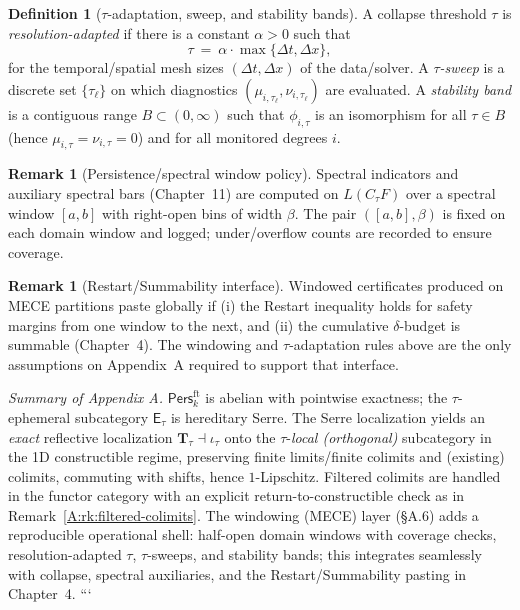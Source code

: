 \documentclass[11pt]{article}
\newcommand{\Pers}{\mathsf{Pers}}
\numberwithin{equation}{section}
\theoremstyle{definition}
\newtheorem{definition}[theorem]{Definition}
\newtheorem{remark}[theorem]{Remark}
\begin{document}
\begin{definition}[\(\tau\)-adaptation, sweep, and stability bands]\label{A:def:tau-adapt}
A collapse threshold \(\tau\) is \emph{resolution-adapted} if there is a constant \(\alpha>0\) such that
\[
\tau\ =\ \alpha\cdot \max\{\Delta t,\Delta x\},
\]
for the temporal/spatial mesh sizes \((\Delta t,\Delta x)\) of the data/solver. A \emph{\(\tau\)-sweep} is a discrete set \(\{\tau_\ell\}\) on which diagnostics \((\mu_{i,\tau_\ell},\nu_{i,\tau_\ell})\) are evaluated. A \emph{stability band} is a contiguous range \(B\subset (0,\infty)\) such that \(\phi_{i,\tau}\) is an isomorphism for all \(\tau\in B\) (hence \(\mu_{i,\tau}=\nu_{i,\tau}=0\)) and for all monitored degrees \(i\).
\end{definition}

\begin{remark}[Persistence/spectral window policy]
Spectral indicators and auxiliary spectral bars (Chapter~11) are computed on \(L(C_\tau F)\) over a spectral window \([a,b]\) with right-open bins of width \(\beta\). The pair \(([a,b],\beta)\) is fixed on each domain window and logged; under/overflow counts are recorded to ensure coverage.
\end{remark}

\begin{remark}[Restart/Summability interface]
Windowed certificates produced on MECE partitions paste globally if (i) the Restart inequality holds for safety margins from one window to the next, and (ii) the cumulative \(\delta\)-budget is summable (Chapter~4). The windowing and \(\tau\)-adaptation rules above are the only assumptions on Appendix~A required to support that interface.
\end{remark}

\medskip
\noindent\emph{Summary of Appendix A.}
\(\Pers^{\mathrm{ft}}_k\) is abelian with pointwise exactness; the \(\tau\)-ephemeral subcategory \(\mathsf{E}_\tau\) is hereditary Serre.
The Serre localization yields an \emph{exact} reflective localization \(\mathbf{T}_\tau\dashv\iota_\tau\) onto the \(\tau\)-\emph{local (orthogonal)} subcategory in the 1D constructible regime, preserving finite limits/finite colimits and (existing) colimits, commuting with shifts, hence \(1\)-Lipschitz.
Filtered colimits are handled in the functor category with an explicit return-to-constructible check as in Remark~\ref{A:rk:filtered-colimits}.
The windowing (MECE) layer (§A.6) adds a reproducible operational shell: half-open domain windows with coverage checks, resolution-adapted \(\tau\), \(\tau\)-sweeps, and stability bands; this integrates seamlessly with collapse, spectral auxiliaries, and the Restart/Summability pasting in Chapter~4.
```
\end{document}
